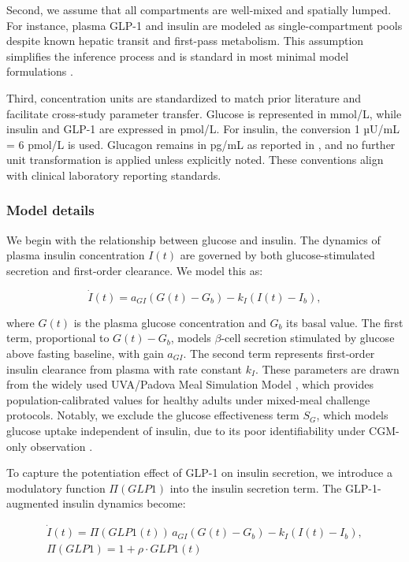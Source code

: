 \documentclass[9pt,shortpaper,twoside,web]{ieeecolor}
\begin{document}
Second, we assume that all compartments are well-mixed and spatially lumped. For instance, plasma GLP-1 and insulin are modeled as single-compartment pools despite known hepatic transit and first-pass metabolism. This assumption simplifies the inference process and is standard in most minimal model formulations \cite{DallaMan2007,DallaMan2016}.

Third, concentration units are standardized to match prior literature and facilitate cross-study parameter transfer. Glucose is represented in mmol/L, while insulin and GLP-1 are expressed in pmol/L. For insulin, the conversion 1 µU/mL = 6 pmol/L is used. Glucagon remains in pg/mL as reported in \cite{Bosch2022}, and no further unit transformation is applied unless explicitly noted. These conventions align with clinical laboratory reporting standards.

\subsubsection{Model details}
We begin with the relationship between glucose and insulin. The dynamics of plasma insulin concentration \( I(t) \) are governed by both glucose-stimulated secretion and first-order clearance. We model this as:

\begin{equation}
\dot I(t) = a_{GI}(G(t) - G_b) - k_I(I(t) - I_b),
\label{eq:G2I}
\end{equation}

where \( G(t) \) is the plasma glucose concentration and \( G_b \) its basal value. The first term, proportional to \( G(t) - G_b \), models $\beta$-cell secretion stimulated by glucose above fasting baseline, with gain \( a_{GI} \). The second term represents first-order insulin clearance from plasma with rate constant \( k_I \). These parameters are drawn from the widely used UVA/Padova Meal Simulation Model \cite{DallaMan2007}, which provides population-calibrated values for healthy adults under mixed-meal challenge protocols. Notably, we exclude the glucose effectiveness term \( S_G \), which models glucose uptake independent of insulin, due to its poor identifiability under CGM-only observation \cite{DallaMan2007}.

To capture the potentiation effect of GLP-1 on insulin secretion, we introduce a modulatory function \( \Pi(GLP1) \) into the insulin secretion term. The GLP-1-augmented insulin dynamics become:

\begin{equation}
\begin{gathered}
\dot I(t) = \Pi(GLP1(t))\,a_{GI}(G(t) - G_b) - k_I(I(t) - I_b), \\
\Pi(GLP1) = 1 + \rho \cdot GLP1(t)
\end{gathered}
\label{eq:GLP2I}
\end{equation}
\end{document}
